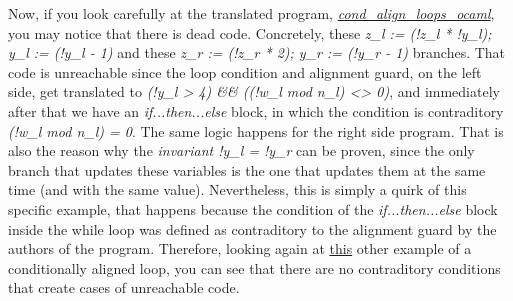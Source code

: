 Now, if you look carefully at the translated program, \hyperref[fig:cond_aligned_ocaml]{\emph{cond\_align\_loops\_ocaml}}, you may notice that there is dead code.
Concretely, these \emph{z\_l := (!z\_l * !y\_l); y\_l := (!y\_l - 1)} and these \emph{z\_r := (!z\_r * 2); y\_r := (!y\_r - 1)} branches.
That code is unreachable since the loop condition and alignment guard, on the left side, get translated to \emph{(!y\_l > 4) \&\& ((!w\_l mod n\_l) <> 0)}, and immediately after that we have an \emph{if...then...else} block, in which the condition is contraditory \emph{(!w\_l mod n\_l) = 0}.
The same logic happens for the right side program.
That is also the reason why the \emph{invariant !y\_l = !y\_r} can be proven, since the only branch that updates these variables is the one that updates them at the same time (and with the same value).
Nevertheless, this is simply a quirk of this specific example, that happens because the condition of the \emph{if...then...else} block inside the while loop was defined as contraditory to the alignment guard by the authors of the program.
Therefore, looking again at \hyperref[fig:trans-ex-third]{this} other example of a conditionally aligned loop, you can see that there are no contraditory conditions that create cases of unreachable code.


